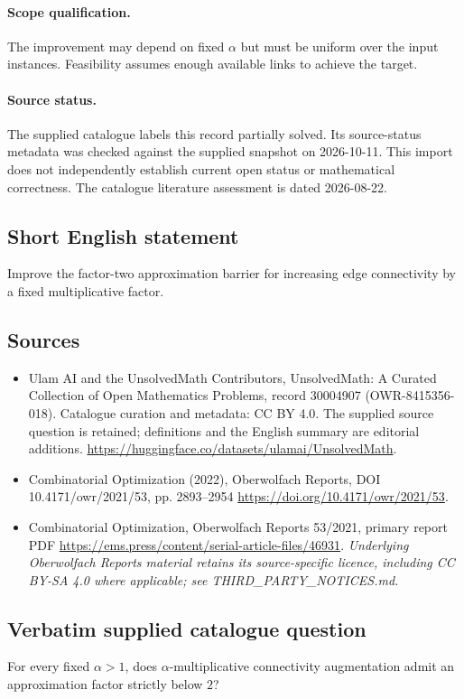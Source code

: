 \documentclass[11pt]{article}
\begin{document}
\paragraph{Scope qualification.}
The improvement may depend on fixed $\alpha$ but must be uniform over the input instances. Feasibility assumes enough available links to achieve the target.
\paragraph{Source status.}
The supplied catalogue labels this record partially solved. Its source-status metadata was checked against the supplied snapshot on 2026-10-11. This import does not independently establish current open status or mathematical correctness. The catalogue literature assessment is dated 2026-08-22.
\subsection{Short English statement}
Improve the factor-two approximation barrier for increasing edge connectivity by a fixed multiplicative factor.
\subsection{Sources}
\begin{itemize}
\item[S1] Ulam AI and the UnsolvedMath Contributors, UnsolvedMath: A Curated Collection of Open Mathematics Problems, record 30004907 (OWR-8415356-018). Catalogue curation and metadata: CC BY 4.0. The supplied source question is retained; definitions and the English summary are editorial additions.
\url{https://huggingface.co/datasets/ulamai/UnsolvedMath}.
\item[S2] Combinatorial Optimization (2022), Oberwolfach Reports, DOI 10.4171/owr/2021/53, pp. 2893--2954
\url{https://doi.org/10.4171/owr/2021/53}.
\item[S3] Combinatorial Optimization, Oberwolfach Reports 53/2021, primary report PDF
\url{https://ems.press/content/serial-article-files/46931}.
\textit{Underlying Oberwolfach Reports material retains its source-specific licence, including CC BY-SA 4.0 where applicable; see THIRD\_PARTY\_NOTICES.md.}
\end{itemize}
\subsection{Verbatim supplied catalogue question}
For every fixed $\alpha>1$, does $\alpha$-multiplicative connectivity augmentation admit an approximation factor strictly below $2$?
\end{document}
